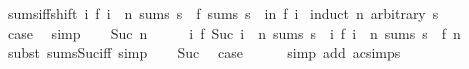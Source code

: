 \begin{isabellebody}
\endisatagproof
{\isafoldproof}%
%
\isadelimproof
\isanewline
%
\endisadelimproof
\isanewline
{}\isamarkupfalse%
\ sums{\isacharunderscore}{\kern0pt}iff{\isacharunderscore}{\kern0pt}shift{\isacharcolon}{\kern0pt}\ {\isachardoublequoteopen}{\isacharparenleft}{\kern0pt}{\isasymlambda}i{\isachardot}{\kern0pt}\ f\ {\isacharparenleft}{\kern0pt}i\ {\isacharplus}{\kern0pt}\ n{\isacharparenright}{\kern0pt}{\isacharparenright}{\kern0pt}\ sums\ s\ {\isasymlongleftrightarrow}\ f\ sums\ {\isacharparenleft}{\kern0pt}s\ {\isacharplus}{\kern0pt}\ {\isacharparenleft}{\kern0pt}{\isasymSum}i{\isacharless}{\kern0pt}n{\isachardot}{\kern0pt}\ f\ i{\isacharparenright}{\kern0pt}{\isacharparenright}{\kern0pt}{\isachardoublequoteclose}\isanewline
%
\isadelimproof
%
\endisadelimproof
%
\isatagproof
{}\isamarkupfalse%
\ {\isacharparenleft}{\kern0pt}induct\ n\ arbitrary{\isacharcolon}{\kern0pt}\ s{\isacharparenright}{\kern0pt}\isanewline
\ \ \isamarkupfalse%
\ {}\isanewline
\ \ \isamarkupfalse%
\ \isamarkupfalse%
\ {\isacharquery}{\kern0pt}case\ \isamarkupfalse%
\ simp\isanewline
{}\isamarkupfalse%
\isanewline
\ \ \isamarkupfalse%
\ {\isacharparenleft}{\kern0pt}Suc\ n{\isacharparenright}{\kern0pt}\isanewline
\ \ \isamarkupfalse%
\ \isamarkupfalse%
\ {\isachardoublequoteopen}{\isacharparenleft}{\kern0pt}{\isasymlambda}i{\isachardot}{\kern0pt}\ f\ {\isacharparenleft}{\kern0pt}Suc\ i\ {\isacharplus}{\kern0pt}\ n{\isacharparenright}{\kern0pt}{\isacharparenright}{\kern0pt}\ sums\ s\ {\isasymlongleftrightarrow}\ {\isacharparenleft}{\kern0pt}{\isasymlambda}i{\isachardot}{\kern0pt}\ f\ {\isacharparenleft}{\kern0pt}i\ {\isacharplus}{\kern0pt}\ n{\isacharparenright}{\kern0pt}{\isacharparenright}{\kern0pt}\ sums\ {\isacharparenleft}{\kern0pt}s\ {\isacharplus}{\kern0pt}\ f\ n{\isacharparenright}{\kern0pt}{\isachardoublequoteclose}\isanewline
\ \ \ \ \isamarkupfalse%
\ {\isacharparenleft}{\kern0pt}subst\ sums{\isacharunderscore}{\kern0pt}Suc{\isacharunderscore}{\kern0pt}iff{\isacharparenright}{\kern0pt}\ simp\isanewline
\ \ \isamarkupfalse%
\ Suc\ \isamarkupfalse%
\ {\isacharquery}{\kern0pt}case\isanewline
\ \ \ \ \isamarkupfalse%
\ {\isacharparenleft}{\kern0pt}simp\ add{\isacharcolon}{\kern0pt}\ ac{\isacharunderscore}{\kern0pt}simps{\isacharparenright}{\kern0pt}\isanewline
{}\isamarkupfalse%
%
\endisatagproof
{\isafoldproof}%
%
\isadelimproof
\isanewline

\end{isabellebody}
